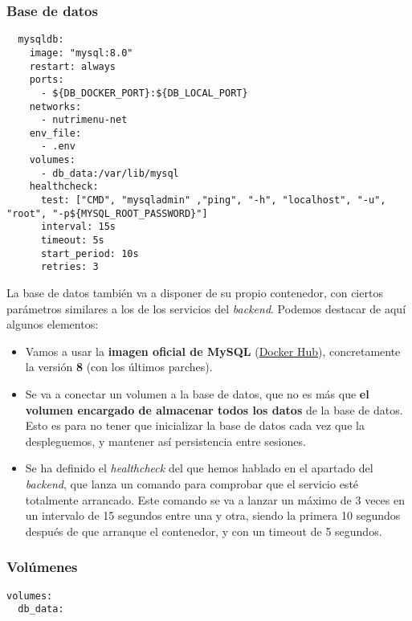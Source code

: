 \subsubsection{Base de datos}

\begin{lstlisting}
  mysqldb:
    image: "mysql:8.0"
    restart: always
    ports:
      - ${DB_DOCKER_PORT}:${DB_LOCAL_PORT}
    networks:
      - nutrimenu-net
    env_file:
      - .env
    volumes:
      - db_data:/var/lib/mysql
    healthcheck:
      test: ["CMD", "mysqladmin" ,"ping", "-h", "localhost", "-u", "root", "-p${MYSQL_ROOT_PASSWORD}"]
      interval: 15s
      timeout: 5s
      start_period: 10s
      retries: 3
\end{lstlisting}

La base de datos también va a disponer de su propio contenedor, con ciertos parámetros similares a los de los servicios del \textit{backend}. Podemos destacar de aquí algunos elementos:

\begin{itemize}
	\item Vamos a usar la \textbf{imagen oficial de MySQL} (\href{https://hub.docker.com/layers/library/mysql/8/images/sha256-1717a37c2adc7772b569eb727bb198b6792f7d50c2adb4839ba637b5c9d88f42?context=explore}{Docker Hub}), concretamente la versión \textbf{8} (con los últimos parches). 
	\item Se va a conectar un volumen a la base de datos, que no es más que \textbf{el volumen encargado de almacenar todos los datos} de la base de datos. Esto es para no tener que inicializar la base de datos cada vez que la despleguemos, y mantener así persistencia entre sesiones.
	\item Se ha definido el \textit{healthcheck} del que hemos hablado en el apartado del \textit{backend}, que lanza un comando para comprobar que el servicio esté totalmente arrancado. Este comando se va a lanzar un máximo de 3 veces en un intervalo de 15 segundos entre una y otra, siendo la primera 10 segundos después de que arranque el contenedor, y con un timeout de 5 segundos.
\end{itemize} 

\subsubsection{Volúmenes}

\begin{lstlisting}
volumes:
  db_data:
\end{lstlisting}

